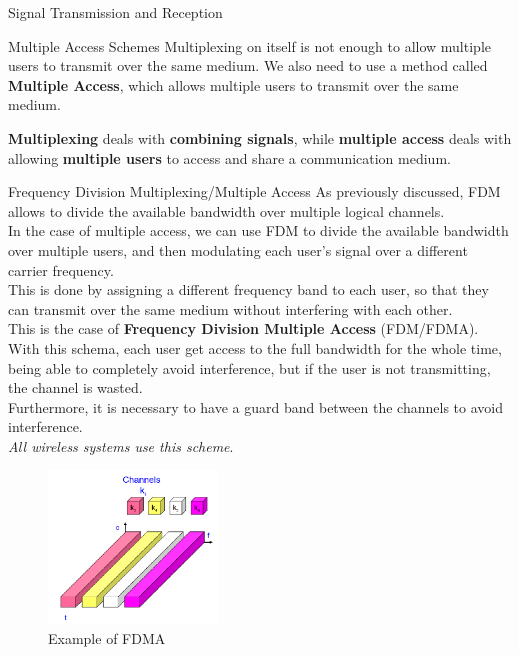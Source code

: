\begin{section}{Signal Transmission and Reception}
\begin{subsection}{Multiple Access Schemes}
    Multiplexing on itself is not enough to allow multiple users to transmit over the same medium.
    We also need to use a method called \textbf{Multiple Access}, which allows multiple users to
    transmit over the same medium.\\
    \begin{boxH}
      \textbf{Multiplexing} deals with \textbf{combining signals}, while \textbf{multiple access} 
      deals with allowing \textbf{multiple users} to access and share a communication medium.
    \end{boxH}
    \begin{subsubsection}{Frequency Division Multiplexing/Multiple Access}
      As previously discussed, FDM allows to divide the available bandwidth over multiple logical
      channels.\\
      In the case of multiple access, we can use FDM to divide the available bandwidth over multiple
      users, and then modulating each user's signal over a different carrier frequency.\\
      This is done by assigning a different frequency band to each user, so that they can transmit
      over the same medium without interfering with each other.\\
      This is the case of \textbf{Frequency Division Multiple Access} (FDM/FDMA).\\
      With this schema, each user get access to the full bandwidth for the whole time, being able to
      completely avoid interference, but if the user is not transmitting, the channel is wasted.\\
      Furthermore, it is necessary to have a guard band between the channels to avoid interference.\\
      \textit{ All wireless systems use this scheme}.
      \begin{figure}[h]
        \centering
        \includegraphics[width=0.4\textwidth]{img/wireless/FDMA.png}
        \caption{Example of FDMA}
        \label{fig:FDMA}
      \end{figure}

\end{subsubsection}
\end{subsection}
\end{section}
